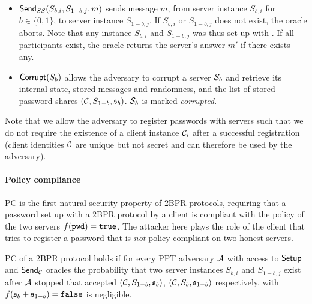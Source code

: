 \begin{itemize}
  \item $\mathsf{Send}_{SS}(S_{b,i},S_{1-b,j},m)$ sends message $m$, from server instance $S_{b,i}$ for $b\in\{0,1\}$, to server instance $S_{1-b,j}$.
        If $S_{b,i}$ or $S_{1-b,j}$ does not exist, the oracle aborts.
        Note that any instance $S_{b,i}$ and $S_{1-b,j}$ was thus set up with \Setup.
        If all participants exist, the oracle returns the server's answer $m'$ if there exists any.

  \item $\mathsf{Corrupt}(S_{b})$ allows the adversary to corrupt a server $\mathcal{S}_b$ and retrieve its internal state, \ie stored messages and randomness, and the list of stored password shares $(\mathcal{C}, S_{1-b}, \mathfrak{s}_b)$. %
      $\mathcal{S}_b$ is marked \emph{corrupted}.
\end{itemize}

\noindent
Note that we allow the adversary to register passwords with servers such that we do not require the existence of a client instance $\mathcal{C}_i$ after a successful registration (client identities $\mathcal{C}$ are unique but not secret and can therefore be used by the adversary).

\paragraph{Policy compliance}
\ac{PC} is the first natural security property of \ac{2BPR} protocols, requiring that a password set up with a \ac{2BPR} protocol by a client is compliant with the policy of the two servers $f(\mathtt{pwd})=\mathtt{true}$.
The attacker here plays the role of the client that tries to register a password \pwd that is \emph{not} policy compliant on two honest servers.


\begin{definition}\label{def:pc}
\acl{PC} of a \ac{2BPR} protocol holds if for every \ac{PPT} adversary $\mathcal{A}$ with access to $\mathsf{Setup}$ and $\mathsf{Send}_\mathcal{C}$ oracles the probability that two server instances $S_{b,i}$ and $S_{1-b,j}$ exist after $\mathcal{A}$ stopped that accepted $(\mathcal{C},S_{1-b},\mathfrak{s}_b)$, $(\mathcal{C},S_{b},\mathfrak{s}_{1-b})$ respectively, with $f(\mathfrak{s}_b+\mathfrak{s}_{1-b})=\mathtt{false}$ is negligible.
\eod
\end{definition}

